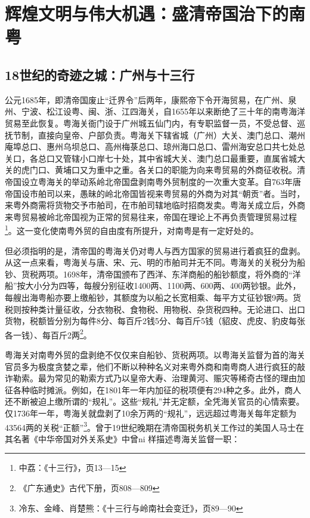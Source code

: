 \chapter{辉煌文明与伟大机遇：盛清帝国治下的南粤}

\section{18世纪的奇迹之城：广州与十三行}

公元1685年，即清帝国废止“迁界令”后两年，康熙帝下令开海贸易，在广州、泉州、宁波、松江设粤、闽、浙、江四海关，自1655年以来断绝了三十年的南粤海洋贸易至此恢复。粤海关衙门设于广州城五仙门内，有专职监督一员，不受总督、巡抚节制，直接向皇帝、户部负责。粤海关下辖省城（广州）大关、澳门总口、潮州庵埠总口、惠州乌坝总口、高州梅菉总口、琼州海口总口、雷州海安总口共七处总关口，各总口又管辖小口岸七十处，其中省城大关、澳门总口最重要，直属省城大关的虎门口、黄埔口又为重中之重。各关口的职能为向来粤贸易的外商征收税。清帝国设立粤海关的举动系岭北帝国盘剥南粤外贸制度的一次重大变革。自763年唐帝国设市舶司以来，愚昧的岭北帝国皆视来粤贸易的外商为对其“朝贡”者。当时，来粤外商需将货物交予市舶司，在市舶司辖地临时招商发卖。粤海关成立后，外商来粤贸易被岭北帝国视为正常的贸易往来，帝国在理论上不再负责管理贸易过程\footnote{中荔：《十三行》，页13—15}。这一变化使南粤外贸的自由度有所提升，对南粤是有一定好处的。

但必须指明的是，清帝国的粤海关仍对粤人与西方国家的贸易进行着疯狂的盘剥。从这一点来看，粤海关与唐、宋、元、明的市舶司并无不同。粤海关的关税分为船钞、货税两项。1698年，清帝国颁布了西洋、东洋商船的船钞额度，将外商的“洋船”按大小分为四等，每艘分别征收1400两、1100两、600两、400两钞银。此外，每艘出海粤船亦要上缴船钞，其额度为以船之长宽相乘、每平方丈征钞银9两。货税则按种类计量征收，分衣物税、食物税、用物税、杂货税四种。无论进口、出口货物，税额皆分别为每件8分、每百斤2钱5分、每百斤5钱（貂皮、虎皮、豹皮每张各一钱）、每百斤2两\footnote{《广东通史》古代下册，页808—809}。

粤海关对南粤外贸的盘剥绝不仅仅来自船钞、货税两项。以粤海关监督为首的海关官员多为极度贪婪之辈，他们不断以种种名义对来粤外商和南粤商人进行疯狂的敲诈勒索。最为常见的勒索方式乃以皇帝大寿、治理黄河、赈灾等稀奇古怪的理由加征各种临时摊派。例如，在1801年一年内加征的税项便有294种之多。此外，商人还不断被迫上缴所谓的“规礼”。这些“规礼”并无定额，全凭海关官员的心情索要。仅1736年一年，粤海关就盘剥了10余万两的“规礼”，远远超过粤海关每年定额为43564两的关税“正额”\footnote{冷东、金峰、肖楚熊：《十三行与岭南社会变迁》，页89—90}。曾于19世纪晚期在清帝国税务机关工作过的美国人马士在其名著《中华帝国对外关系史》中曾ni 样描述粤海关监督一职：

